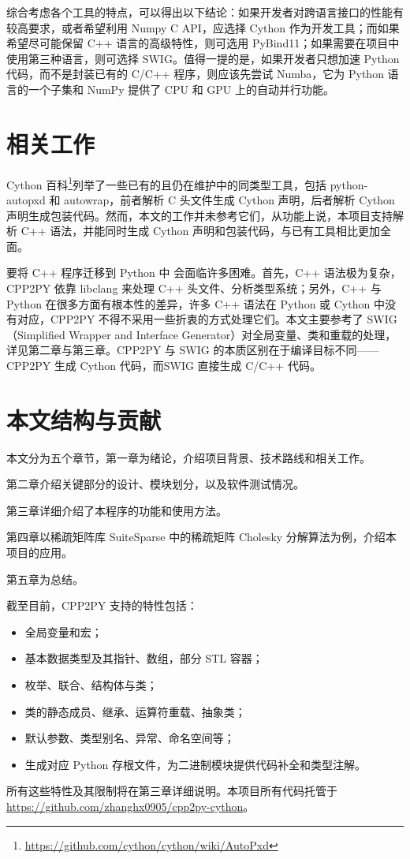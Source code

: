 综合考虑各个工具的特点，可以得出以下结论：如果开发者对跨语言接口的性能有较高要求，或者希望利用 Numpy C API，应选择 Cython 作为开发工具；而如果希望尽可能保留 C++ 语言的高级特性，则可选用 PyBind11；如果需要在项目中使用第三种语言，则可选择 SWIG。值得一提的是，如果开发者只想加速 Python 代码，而不是封装已有的 C/C++ 程序，则应该先尝试 Numba，它为 Python 语言的一个子集和 NumPy 提供了 CPU 和 GPU 上的自动并行功能。

\section{相关工作}

Cython 百科\footnote{\url{https://github.com/cython/cython/wiki/AutoPxd}}列举了一些已有的且仍在维护中的同类型工具，包括 python-autopxd 和 autowrap，前者解析 C 头文件生成 Cython 声明，后者解析 Cython 声明生成包装代码。然而，本文的工作并未参考它们，从功能上说，本项目支持解析 C++ 语法，并能同时生成 Cython 声明和包装代码，与已有工具相比更加全面。

要将 C++ 程序迁移到 Python 中 会面临许多困难。首先，C++ 语法极为复杂，CPP2PY 依靠 libclang 来处理 C++ 头文件、分析类型系统；另外，C++ 与 Python 在很多方面有根本性的差异，许多 C++ 语法在 Python 或 Cython 中没有对应，CPP2PY 不得不采用一些折衷的方式处理它们。本文主要参考了 SWIG\cite{swig} （Simplified Wrapper and Interface Generator）对全局变量、类和重载的处理，详见第二章与第三章。CPP2PY 与 SWIG 的本质区别在于编译目标不同——CPP2PY 生成 Cython 代码，而SWIG 直接生成 C/C++ 代码。

\section{本文结构与贡献}

本文分为五个章节，第一章为绪论，介绍项目背景、技术路线和相关工作。

第二章介绍关键部分的设计、模块划分，以及软件测试情况。

第三章详细介绍了本程序的功能和使用方法。

第四章以稀疏矩阵库 SuiteSparse 中的稀疏矩阵 Cholesky 分解算法为例，介绍本项目的应用。

第五章为总结。

截至目前，CPP2PY 支持的特性包括：

\begin{itemize}
    \item 全局变量和宏；
    \item 基本数据类型及其指针、数组，部分 STL 容器；
    \item 枚举、联合、结构体与类；
    \item 类的静态成员、继承、运算符重载、抽象类；
    \item 默认参数、类型别名、异常、命名空间等；
    \item 生成对应 Python 存根文件，为二进制模块提供代码补全和类型注解。
\end{itemize}

所有这些特性及其限制将在第三章详细说明。本项目所有代码托管于 \url{https://github.com/zhanghx0905/cpp2py-cython}。 